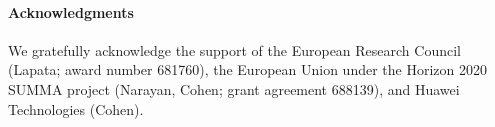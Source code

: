 \documentclass[11pt,a4paper]{article}
\begin{document}
\vspace{-0.1cm}


\paragraph{Acknowledgments} We gratefully acknowledge the support of
the European Research Council (Lapata; award number 681760), the
European Union under the Horizon 2020 SUMMA project (Narayan, Cohen;
grant agreement 688139), and Huawei Technologies (Cohen).






\end{document}
